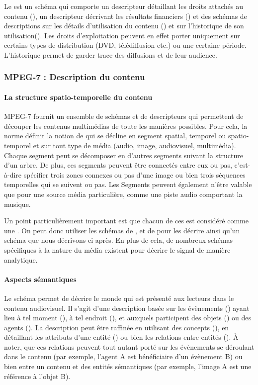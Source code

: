 Le  est un schéma qui comporte un descripteur détaillant les droits attachés au contenu (), un descripteur décrivant les résultats financiers () et des schémas de descriptions sur les détails d'utilisation du contenu () et sur l'historique de son utilisation().
Les droits d'exploitation peuvent en effet porter uniquement sur certains types de distribution (DVD, télédiffusion etc.) ou une certaine période. 
L'historique permet de garder trace des diffusions et de leur audience.


\subsubsection{MPEG-7 : Description du contenu}\label{sec:mpeg7-dc}
\paragraph{La structure spatio-temporelle du contenu}
MPEG-7 fournit un ensemble de schémas et de descripteurs qui permettent de découper les contenus multimédias de toute les manières possibles. 
Pour cela, la norme définit la notion de  qui se décline en segment spatial, temporel ou spatio-temporel et sur tout type de média (audio, image, audiovisuel, multimédia). 
Chaque segment peut se décomposer en d'autres segments suivant la structure d'un arbre. 
De plus, ces segments peuvent être connectés entre eux ou pas, c'est-à-dire spécifier trois zones connexes ou pas d'une image ou bien trois séquences temporelles qui se suivent ou pas. 
Les Segments peuvent également n'être valable que pour une source média particulière, comme une piste audio comportant la musique.

Un point particulièrement important est que chacun de ces  est considéré comme une . 
On peut donc utiliser les schémas de ,  et de  pour les décrire ainsi qu'un schéma  que nous décrivons ci-après. 
En plus de cela, de nombreux schémas spécifiques à la nature du média existent pour décrire le signal de manière analytique. 


\paragraph{Aspects sémantiques}
Le schéma  permet de décrire le monde qui est présenté aux lecteurs dans le contenu audiovisuel. 
Il s'agit d'une description basée sur les évènements () ayant lieu à tel moment (), à tel endroit (), et auxquels participent des objets () ou des agents (). 
La description peut être raffinée en utilisant des concepts (), en détaillant les attributs d'une entité () ou bien les relations entre entités ().
À noter, que ces relations peuvent tout autant porté sur les évènements se déroulant dans le contenu (par exemple, l'agent A est bénéficiaire d'un évènement B) ou bien entre un contenu et des entités sémantiques (par exemple, l'image A est une référence à l'objet B).

